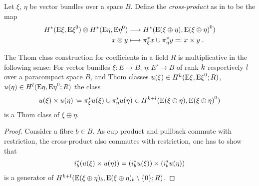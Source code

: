 \begin{Def}
  Let $\xi$, $\eta$ be vector bundles over a space $B$.
  Define the \emph{cross-product} as in \cite[p.~214]{hatcher} to be
  the map
    \begin{align*}
      H^*(\mathrm{E}\xi, {\mathrm{E}\xi}^0)
      \otimes
      H^*(\mathrm{E}\eta, {\mathrm{E}\eta}^0)
      &\longrightarrow
        H^*(\mathrm{E}(\xi\oplus\eta), {\mathrm{E}(\xi\oplus\eta)}^0)\\
      x\otimes y
      &\longmapsto
        {\pi}^*_\xi x \cup {\pi}^*_\eta y
        \eqqcolon x\times y
        \;.
    \end{align*}
\end{Def}
\begin{Cor}\label{cor:thomclassmultiplicative}
  The Thom class construction for coefficients in a field $R$ is
  multiplicative in the following sense:
  For vector bundles $\xi\colon E\to B$, $\eta\colon E'\to B$
  of rank $k$ respectively $l$ over a paracompact space $B$, and Thom
  classes
  ${u}(\xi)\in H^{k}(\mathrm{E}\xi, {\mathrm{E}\xi}^0; R)$,
  ${u}(\eta)\in H^{l}(\mathrm{E}\eta, {\mathrm{E}\eta}^0; R)$
  the class
  \begin{gather*}
    {u}(\xi)\times{u}(\eta)
    \coloneqq {\pi}^*_\xi{u}(\xi) \cup {\pi}^*_\eta{u}(\eta)
    \in H^{k+l}(\mathrm{E}(\xi\oplus\eta), {\mathrm{E}(\xi\oplus\eta)}^0)
  \end{gather*}
  is a Thom class of $\xi\oplus\eta$.
  \begin{proof}
    Consider a fibre $b\in B$. As cup product and pullback commute
    with restriction, the cross-product also commutes with
    restriction, \idest one has to show that
    \begin{gather*}
      {i}^*_b({u}(\xi)\times{u}(\eta))
      = \left({i}^*_b{u}(\xi)\right)
      \times \left({i}^*_b{u}(\eta)\right)
    \end{gather*}
    is a generator of
    $H^{k+l}(\mathrm{E}(\xi\oplus\eta)_b, {\mathrm{E}(\xi\oplus\eta)_b}\setminus\{0\};R)$.

\end{proof}
\end{Cor}
